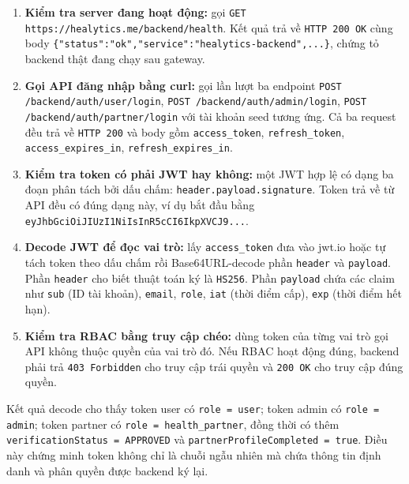 \begin{enumerate}
    \item \textbf{Kiểm tra server đang hoạt động:} gọi \texttt{GET https://healytics.me/backend/health}. Kết quả trả về \texttt{HTTP 200 OK} cùng body \texttt{\{"status":"ok",}\allowbreak\texttt{"service":"healytics-backend",...\}}, chứng tỏ backend thật đang chạy sau gateway.
    \item \textbf{Gọi API đăng nhập bằng curl:} gọi lần lượt ba endpoint \texttt{POST /backend/auth/user/login}, \texttt{POST /backend/auth/admin/login}, \texttt{POST /backend/auth/partner/login} với tài khoản seed tương ứng. Cả ba request đều trả về \texttt{HTTP 200} và body gồm \texttt{access\_token}, \texttt{refresh\_token}, \texttt{access\_expires\_in}, \texttt{refresh\_expires\_in}.
    \item \textbf{Kiểm tra token có phải JWT hay không:} một JWT hợp lệ có dạng ba đoạn phân tách bởi dấu chấm: \texttt{header.payload.signature}. Token trả về từ API đều có đúng dạng này, ví dụ bắt đầu bằng \texttt{eyJhbGciOiJIUzI1NiIs}\allowbreak\texttt{InR5cCI6IkpXVCJ9...}.
    \item \textbf{Decode JWT để đọc vai trò:} lấy \texttt{access\_token} đưa vào jwt.io hoặc tự tách token theo dấu chấm rồi Base64URL-decode phần \texttt{header} và \texttt{payload}. Phần \texttt{header} cho biết thuật toán ký là \texttt{HS256}. Phần \texttt{payload} chứa các claim như \texttt{sub} (ID tài khoản), \texttt{email}, \texttt{role}, \texttt{iat} (thời điểm cấp), \texttt{exp} (thời điểm hết hạn).
    \item \textbf{Kiểm tra RBAC bằng truy cập chéo:} dùng token của từng vai trò gọi API không thuộc quyền của vai trò đó. Nếu RBAC hoạt động đúng, backend phải trả \texttt{403 Forbidden} cho truy cập trái quyền và \texttt{200 OK} cho truy cập đúng quyền.
\end{enumerate}

Kết quả decode cho thấy token user có \texttt{role = user}; token admin có \texttt{role = admin}; token partner có \texttt{role = health\_partner}, đồng thời có thêm \texttt{verificationStatus = APPROVED} và \texttt{partnerProfileCompleted = true}. Điều này chứng minh token không chỉ là chuỗi ngẫu nhiên mà chứa thông tin định danh và phân quyền được backend ký lại.

